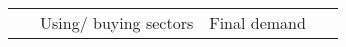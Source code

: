 \documentclass[12pt,english]{article}
\begin{document}
\begin{table}[!b]
	\centering
	\begin{adjustbox}{width=\textwidth}
		\renewcommand*{\arraystretch}{1.15}
		\small
		\begin{tabular}{cr|ccccc|b{30pt}b{30pt}p{30pt}b{30pt}b{30pt}|c|c}
			\multicolumn{2}{c}{\ }		& \multicolumn{5}{c}{Using/ buying sectors} & \multicolumn{5}{c}{Final demand}  &  \multicolumn{2}{c}{\ }	   \\
			

\end{tabular}
\end{adjustbox}
\end{table}
\end{document}
